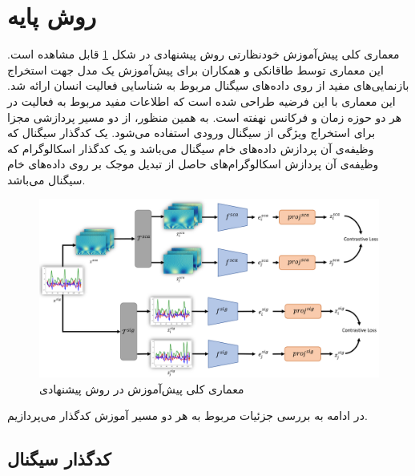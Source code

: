 \section{روش پایه}

معماری کلی پیش‌آموزش خودنظارتی روش پیشنهادی در شکل \ref{fig:proposed-method-pretraining}
قابل مشاهده است. این معماری توسط طاقانکی و همکاران\cite{taghanaki2023self}
برای پیش‌آموزش یک مدل جهت استخراج بازنمایی‌های مفید از روی داده‌های سیگنال مربوط به شناسایی فعالیت انسان ارائه شد. این معماری با این فرضیه طراحی شده است که اطلاعات مفید مربوط به فعالیت در هر دو حوزه زمان و فرکانس نهفته است. به همین منظور، از دو مسیر پردازشی مجزا برای استخراج ویژگی از سیگنال ورودی استفاده می‌شود. یک کدگذار سیگنال که وظیفه‌ی آن پردازش داده‌های خام سیگنال می‌باشد و یک کدگذار اسکالوگرام که وظیفه‌ی آن پردازش اسکالوگرام‌های حاصل از تبدیل موجک
بر روی داده‌های خام سیگنال می‌باشد.

\begin{figure}[ht]
\centering
\includegraphics[width=1\textwidth]{Images/Chapter3/proposed-method-pretraining.png}
\caption{معماری کلی پیش‌آموزش در روش پیشنهادی}
\label{fig:proposed-method-pretraining}
\end{figure}

در ادامه به بررسی جزئیات مربوط به هر دو مسیر آموزش کدگذار می‌پردازیم.

\subsection{کدگذار سیگنال}

